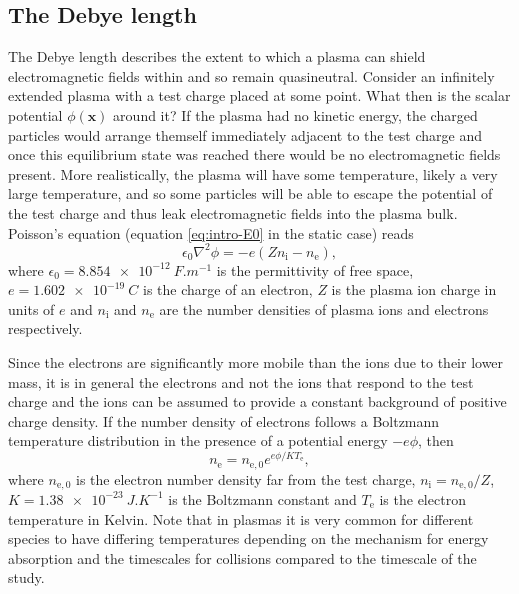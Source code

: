 \subsection{\label{sec:debye_length}The Debye length}
The Debye length describes the extent to which a plasma can shield electromagnetic fields within and so remain quasineutral. Consider an infinitely extended plasma with a test charge placed at some point. What then is the scalar potential $\phi(\mathbf{x})$ around it? If the plasma had no kinetic energy, the charged particles would arrange themself immediately adjacent to the test charge and once this equilibrium state was reached there would be no electromagnetic fields present. More realistically, the plasma will have some temperature, likely a very large temperature, and so some particles will be able to escape the potential of the test charge and thus leak electromagnetic fields into the plasma bulk. Poisson's equation (equation \ref{eq:intro-E0} in the static case) reads
\begin{equation}\label{eq:poisson}
	\epsilon_0\nabla^2\phi = -e(Zn_\mathrm{i} - n_\mathrm{e}),
\end{equation}
where $\epsilon_0 = \qty{8.854e-12}{F.m^{-1}}$ is the permittivity of free space, $e = \qty{1.602e-19}{C}$ is the charge of an electron, $Z$ is the plasma ion charge in units of $e$ and $n_\mathrm{i}$ and $n_\mathrm{e}$ are the number densities of plasma ions and electrons respectively.

Since the electrons are significantly more mobile than the ions due to their lower mass, it is in general the electrons and not the ions that respond to the test charge and the ions can be assumed to provide a constant background of positive charge density.
If the number density of electrons follows a Boltzmann temperature distribution in the presence of a potential energy $-e\phi$, then
\begin{equation}\label{eq:nj_boltzmann}
	n_\mathrm{e}= n_{\mathrm{e},0}e^{e\phi/KT_\mathrm{e}},
\end{equation}
where $n_{\mathrm{e},0}$ is the electron number density far from the test charge, $n_\mathrm{i} = n_{\mathrm{e},0}/Z$, $K = \qty{1.38e-23}{J.K^{-1}}$ is the Boltzmann constant and $T_\mathrm{e}$ is the electron temperature in Kelvin. Note that in plasmas it is very common for different species to have differing temperatures depending on the mechanism for energy absorption and the timescales for collisions compared to the timescale of the study.

